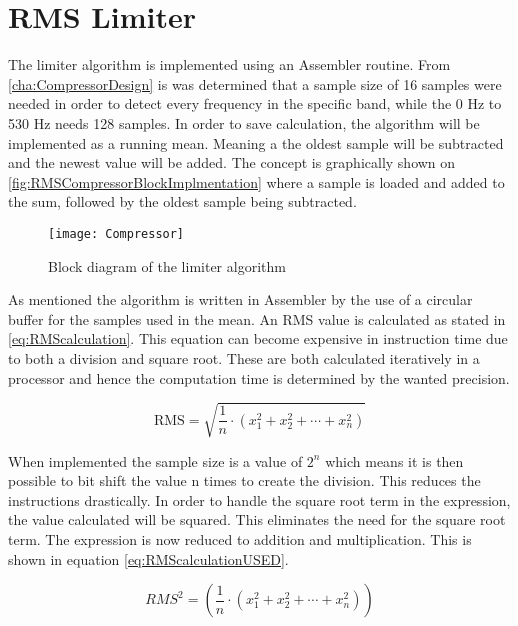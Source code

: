 \chapter{RMS Limiter}

The limiter algorithm is implemented using an Assembler routine. From \ref{cha:CompressorDesign} is was determined that a sample size of 16 samples were needed in order to detect every frequency in the specific band, while the 0 Hz to 530 Hz needs 128 samples. In order to save calculation, the algorithm will be implemented as a running mean. Meaning a the oldest sample will be subtracted and the newest value will be added. The concept is graphically shown on \autoref{fig:RMSCompressorBlockImplmentation} where a sample is loaded and added to the sum, followed by the oldest sample being subtracted.


\begin{figure}[H]
    \centering
\texttt{[image: Compressor]}
    \caption{Block diagram of the limiter algorithm}
    \label{fig:RMSCompressorBlockImplmentation}
\end{figure}

As mentioned the algorithm is written in Assembler by the use of a circular buffer for the samples used in the mean. %
An RMS value is calculated as stated in \autoref{eq:RMScalculation}. This equation can become expensive in instruction time due to both a division and square root. These are both calculated iteratively in a processor and hence the computation time is determined by the wanted precision. 

\begin{equation}\label{eq:RMScalculation}
\text{RMS}=\sqrt{\frac{1}{n}\cdot(x_1^2+x_2^2+\cdots+x_n^2)}
\end{equation}

When implemented the sample size is a value of $2^n$ which means it is then possible to bit shift the value n times to create the division. This reduces the instructions drastically. In order to handle the square root term in the expression, the value calculated will be squared. This eliminates the need for the square root term. The expression is now reduced to addition and multiplication. This is shown in equation \ref{eq:RMScalculationUSED}.

\begin{equation}\label{eq:RMScalculationUSED}
RMS^2=(\frac{1}{n}\cdot(x_1^2+x_2^2+\cdots+x_n^2))
\end{equation}

